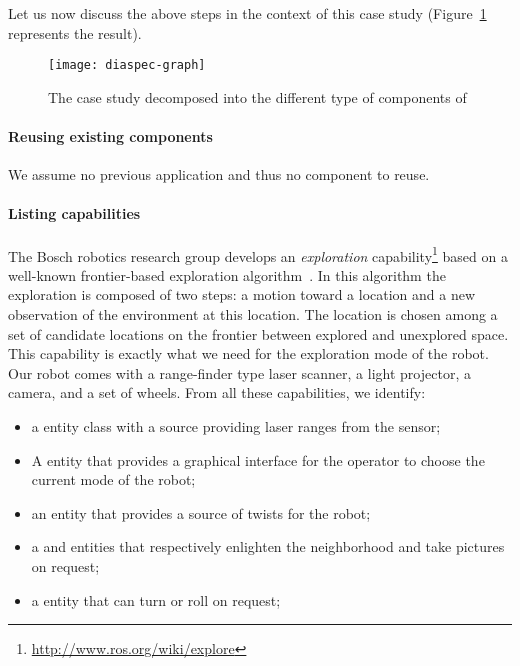 Let us now discuss the above steps in the context of this case
study (Figure~\ref{fig:diaspec-graph} represents the result).

\begin{figure}
  \centering
  \texttt{[image: diaspec-graph]}
  \caption{The case study decomposed into the different type of
    components of \diaspec{}}
\label{fig:diaspec-graph}
\end{figure}

\paragraph*{Reusing existing components}
We assume no previous \diaspec{} application and thus no \diaspec{}
component to reuse.

\paragraph*{Listing capabilities}
The Bosch robotics research group develops an \emph{exploration}
capability\footnote{\url{http://www.ros.org/wiki/explore}} based on a
well-known frontier-based exploration algorithm~\cite{Yamau98a}. In
this algorithm the exploration is composed of two steps: a motion
toward a location and a new observation of the environment at this
location. The location is chosen among a set of candidate locations on
the frontier between explored and unexplored space. This capability is
exactly what we need for the exploration mode of the robot. Our robot
comes with a range-finder type laser scanner, a light projector, a
camera, and a set of wheels. From all these capabilities, we identify:

\begin{itemize}
\item a  entity class with a  source
  providing laser ranges from the sensor;
\item A  entity that provides a graphical interface
  for the operator to choose the current mode of the robot;
\item an  entity that provides a source of twists for
  the robot;
\item a  and  entities that respectively
  enlighten the neighborhood and take pictures on request;
\item a  entity that can turn or roll on request;
\end{itemize}

